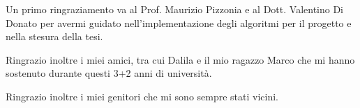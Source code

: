 Un primo ringraziamento va al Prof. Maurizio Pizzonia e al Dott. Valentino Di Donato per avermi guidato nell'implementazione degli algoritmi per il progetto e nella stesura della tesi.

Ringrazio inoltre i miei amici, tra cui Dalila e il mio ragazzo Marco che mi hanno sostenuto durante questi 3+2 anni di università.

Ringrazio inoltre i miei genitori che mi sono sempre stati vicini.